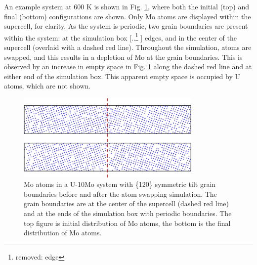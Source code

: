 \documentclass[review]{elsarticle}
\providecommand{\DIFaddtex}[1]{{\protect\color{blue} \sf #1}} %
\providecommand{\DIFdeltex}[1]{{\protect\color{red} [..\footnote{removed: #1} ]}} %
\providecommand{\DIFaddbegin}{} %
\providecommand{\DIFaddend}{} %
\providecommand{\DIFdelbegin}{} %
\providecommand{\DIFdelend}{} %
\providecommand{\DIFadd}[1]{\texorpdfstring{\DIFaddtex{#1}}{#1}} %
\providecommand{\DIFdel}[1]{\texorpdfstring{\DIFdeltex{#1}}{}} %
\newcommand{\DIFscaledelfig}{0.5}
\newlength{\DIFdelgraphicswidth} %
\newlength{\DIFdelgraphicsheight} %
\newcommand{\DIFaddincludegraphics}[2][]{{\color{blue}\fbox{\DIFOincludegraphics[#1]{#2}}}} %
\newcommand{\DIFdelincludegraphics}[2][]{%
\sbox{\DIFdelgraphicsbox}{\DIFOincludegraphics[#1]{#2}}%
\settoboxwidth{\DIFdelgraphicswidth}{\DIFdelgraphicsbox} %
\settoboxtotalheight{\DIFdelgraphicsheight}{\DIFdelgraphicsbox} %
\scalebox{\DIFscaledelfig}{%
\parbox[b]{\DIFdelgraphicswidth}{\usebox{\DIFdelgraphicsbox}\\[-\baselineskip] \rule{\DIFdelgraphicswidth}{0em}}\llap{\resizebox{\DIFdelgraphicswidth}{\DIFdelgraphicsheight}{%
\setlength{\unitlength}{\DIFdelgraphicswidth}%
\begin{picture}(1,1)%
\thicklines\linethickness{2pt} %
{\color[rgb]{1,0,0}\put(0,0){\framebox(1,1){}}}%
{\color[rgb]{1,0,0}\put(0,0){\line( 1,1){1}}}%
{\color[rgb]{1,0,0}\put(0,1){\line(1,-1){1}}}%
\end{picture}%
}\hspace*{3pt}}} %
} %
\DeclareRobustCommand{\DIFaddbegin}{\DIFOaddbegin \let\includegraphics\DIFaddincludegraphics} %
\DeclareRobustCommand{\DIFaddend}{\DIFOaddend \let\includegraphics\DIFOincludegraphics} %
\DeclareRobustCommand{\DIFdelbegin}{\DIFOdelbegin \let\includegraphics\DIFdelincludegraphics} %
\DeclareRobustCommand{\DIFdelend}{\DIFOaddend \let\includegraphics\DIFOincludegraphics} %
\begin{document}
An example system at 600 K is shown in Fig. \ref{fig:600mcmd}, where both the initial (top) and final (bottom) configurations are shown. Only Mo atoms are displayed within the supercell, for clarity. As the system is periodic, two grain boundaries are present within the system: at the simulation box \DIFdelbegin \DIFdel{edge}\DIFdelend \DIFaddbegin \DIFadd{edges}\DIFaddend , and in the center of the supercell (overlaid with a dashed red line). Throughout the simulation, atoms are swapped, and this results in a depletion of Mo at the grain boundaries. This is observed by an increase in empty space in Fig. \ref{fig:600mcmd} along the dashed red line and at either end of the simulation box. This apparent empty space is occupied by U atoms, which are not shown.

\begin{figure}[h]
 \centering
 \includegraphics[width=0.8\textwidth]{600mcmd.png} 
 \caption{Mo atoms in a U-10Mo system with \{120\} symmetric tilt grain boundaries before and after the atom swapping simulation. The grain boundaries are at the center of the supercell (dashed red line) and at the ends of the simulation box with periodic boundaries. The top figure is initial distribution of Mo atoms, the bottom is the final distribution of Mo atoms.}
 \label{fig:600mcmd}
\end{figure}

\FloatBarrier
\end{document}

